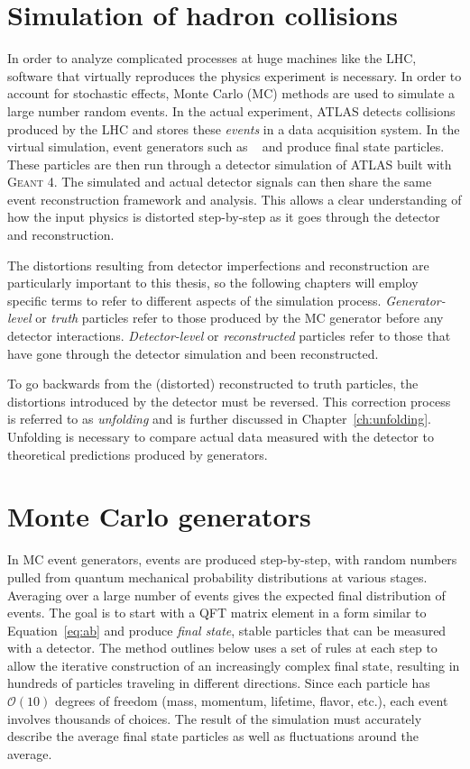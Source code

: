 \section{Simulation of hadron collisions}

In order to analyze complicated processes at huge machines like the LHC, software that virtually reproduces the physics experiment is necessary. In order to account for stochastic effects, Monte Carlo (MC) methods are used to simulate a large number random events.  In the actual experiment, ATLAS detects collisions produced by the LHC and stores these \emph{events} in a data acquisition system. In the virtual simulation, event generators such as \hw~\cite{Herwig} and \py\cite{pythia6} produce final state particles. These particles are then run through a detector simulation of ATLAS built with \textsc{Geant 4}. The simulated and actual detector signals can then share the same event reconstruction framework and analysis. This allows a clear understanding of how the input physics is distorted step-by-step as it goes through the detector and reconstruction. 

The distortions resulting from detector imperfections and reconstruction are particularly important to this thesis, so the following chapters will employ specific terms to refer to different aspects of the simulation process. \emph{Generator-level} or \emph{truth} particles refer to those produced by the MC generator before any detector interactions. \emph{Detector-level} or \emph{reconstructed} particles refer to those that have gone through the detector simulation and been reconstructed. 

To go backwards from the (distorted) reconstructed to truth particles, the distortions introduced by the detector must be reversed. This correction process is referred to as \emph{unfolding} and is further discussed in Chapter~\ref{ch:unfolding}. Unfolding is necessary to compare actual data measured with the detector to theoretical predictions produced by generators.
\section{Monte Carlo generators}
In MC event generators, events are produced step-by-step, with random numbers pulled from quantum mechanical probability distributions at various stages\cite{PDG,Sjostrand:2009ad}.  Averaging over a large number of events gives the expected final distribution of events. The goal is to start with a QFT matrix element in a form similar to Equation~\ref{eq:ab} and produce \emph{final state}, stable particles that can be measured with a detector. The method outlines below uses a set of rules at each step to allow the iterative construction of an increasingly complex final state, resulting in hundreds of particles traveling in different directions. Since each particle has $\mathcal{O}(10)$ degrees of freedom (mass, momentum, lifetime, flavor, etc.), each event involves thousands of choices. The result of the simulation must accurately describe the average final state particles as well as fluctuations around the average. 


